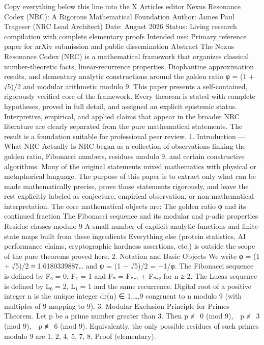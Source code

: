 Copy everything below this line into the X Articles editor
Nexus Resonance Codex (NRC): A Rigorous Mathematical Foundation
Author:
James Paul Trageser (NRC Lead Architect)
Date:
August 2026
Status:
Living research compilation with complete elementary proofs
Intended use:
Primary reference paper for arXiv submission and public dissemination
Abstract
The Nexus Resonance Codex (NRC) is a mathematical framework that organizes classical number-theoretic facts, linear-recurrence properties, Diophantine approximation results, and elementary analytic constructions around the golden ratio φ = (1 + √5)/2 and modular arithmetic modulo 9. This paper presents a self-contained, rigorously verified core of the framework. Every theorem is stated with complete hypotheses, proved in full detail, and assigned an explicit epistemic status. Interpretive, empirical, and applied claims that appear in the broader NRC literature are clearly separated from the pure mathematical statements. The result is a foundation suitable for professional peer review.
1. Introduction — What NRC Actually Is
NRC began as a collection of observations linking the golden ratio, Fibonacci numbers, residues modulo 9, and certain constructive algorithms. Many of the original statements mixed mathematics with physical or metaphorical language. The purpose of this paper is to extract only what can be made mathematically precise, prove those statements rigorously, and leave the rest explicitly labeled as conjecture, empirical observation, or non-mathematical interpretation.
The core mathematical objects are:
The golden ratio φ and its continued fraction
The Fibonacci sequence and its modular and p-adic properties
Residue classes modulo 9
A small number of explicit analytic functions and finite-state maps built from these ingredients
Everything else (protein statistics, AI performance claims, cryptographic hardness assertions, etc.) is outside the scope of the pure theorems proved here.
2. Notation and Basic Objects
We write φ = (1 + √5)/2 ≈ 1.6180339887… and ψ = (1 − √5)/2 = −1/φ.
The Fibonacci sequence is defined by F₀ = 0, F₁ = 1 and Fₙ = Fₙ₋₁ + Fₙ₋₂ for n ≥ 2.
The Lucas sequence is defined by L₀ = 2, L₁ = 1 and the same recurrence.
Digital root of a positive integer n is the unique integer dr(n) ∈ {1,…,9} congruent to n modulo 9 (with multiples of 9 mapping to 9).
3. Modular Exclusion Principle for Primes
Theorem.
Let p be a prime number greater than 3. Then
p ≢ 0 (mod 9), p ≢ 3 (mod 9), p ≢ 6 (mod 9).
Equivalently, the only possible residues of such primes modulo 9 are {1, 2, 4, 5, 7, 8}.
Proof (elementary).
